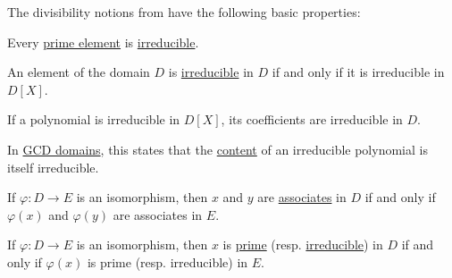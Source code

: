 \begin{proposition}\label{thm:def:domain_divisibility}
  The divisibility notions from  have the following basic properties:
  \begin{thmenum}
     Every \hyperref[def:domain_divisibility/prime]{prime element} is \hyperref[def:domain_divisibility/irreducible]{irreducible}.

     An element of the domain \( D \) is \hyperref[def:domain_divisibility/irreducible]{irreducible} in \( D \) if and only if it is irreducible in \( D[X] \).

     If a polynomial is irreducible in \( D[X] \), its coefficients are irreducible in \( D \).

    In \hyperref[def:gcd_domain]{GCD domains}, this states that the \hyperref[def:polynomial_content]{content} of an irreducible polynomial is itself irreducible.

     If \( \varphi: D \to E \) is an isomorphism, then \( x \) and \( y \) are \hyperref[def:domain_divisibility/associates]{associates} in \( D \) if and only if \( \varphi(x) \) and \( \varphi(y) \) are associates in \( E \).

     If \( \varphi: D \to E \) is an isomorphism, then \( x \) is \hyperref[def:domain_divisibility/prime]{prime} (resp. \hyperref[def:domain_divisibility/irreducible]{irreducible}) in \( D \) if and only if \( \varphi(x) \) is prime (resp. irreducible) in \( E \).
  \end{thmenum}
\end{proposition}
